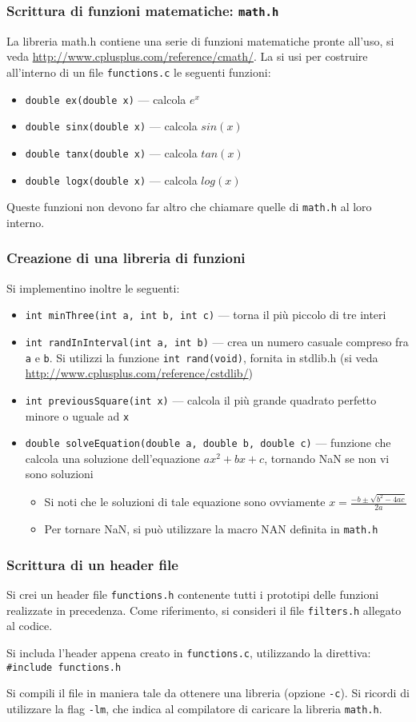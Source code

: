 \documentclass{beamer}
\begin{document}
\begin{frame}
\frametitle{Scrittura di funzioni matematiche: \texttt{math.h}}
La libreria math.h contiene una serie di funzioni matematiche pronte all'uso, si veda \url{http://www.cplusplus.com/reference/cmath/}. La si usi per costruire all'interno di un file \texttt{functions.c} le seguenti funzioni:
\begin{itemize}
 \item \texttt{double ex(double x)} --- calcola $e^x$
 \item \texttt{double sinx(double x)} --- calcola $sin(x)$
 \item \texttt{double tanx(double x)} --- calcola $tan(x)$
 \item \texttt{double logx(double x)} --- calcola $log(x)$
\end{itemize}
Queste funzioni non devono far altro che chiamare quelle di \texttt{math.h} al loro interno.
\end{frame}

\begin{frame}
\frametitle{Creazione di una libreria di funzioni}
Si implementino inoltre le seguenti:
\begin{itemize}
 \item \texttt{int minThree(int a, int b, int c)} --- torna il più piccolo di tre interi
 \item \texttt{int randInInterval(int a, int b)} --- crea un numero casuale compreso fra \texttt{a} e \texttt{b}. Si utilizzi la funzione \texttt{int rand(void)}, fornita in stdlib.h (si veda \url{http://www.cplusplus.com/reference/cstdlib/})
 \item \texttt{int previousSquare(int x)} --- calcola il più grande quadrato perfetto minore o uguale ad \texttt{x}
 \item \texttt{double solveEquation(double a, double b, double c)} --- funzione che calcola una soluzione dell'equazione $ax^2 + bx + c$, tornando NaN se non vi sono soluzioni
 \begin{itemize}
  \item Si noti che le soluzioni di tale equazione sono  ovviamente $x = \frac{-b \pm \sqrt{b^2-4ac}}{2a}$
  \item Per tornare NaN, si può utilizzare la macro NAN definita in \texttt{math.h}
 \end{itemize}
\end{itemize}
\end{frame}

\begin{frame}
\frametitle{Scrittura di un header file}
Si crei un header file \texttt{functions.h} contenente tutti i prototipi delle funzioni realizzate in precedenza. Come riferimento, si consideri il file \texttt{filters.h} allegato al codice.

Si includa l'header appena creato in \texttt{functions.c}, utilizzando la direttiva: \\
\texttt{\#include \textquotedbl{}functions.h\textquotedbl{}}

Si compili il file in maniera tale da ottenere una libreria (opzione \texttt{-c}). Si ricordi di utilizzare la flag \texttt{-lm}, che indica al compilatore di caricare la libreria \texttt{math.h}.
\end{frame}
\end{document}
